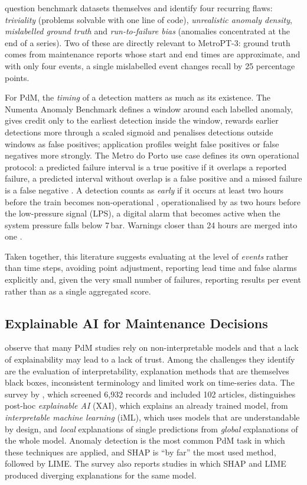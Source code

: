 \citet{wu2021flawed} question benchmark datasets themselves and identify four recurring flaws: \emph{triviality} (problems solvable with one line of code), \emph{unrealistic anomaly density}, \emph{mislabelled ground truth} and \emph{run-to-failure bias} (anomalies concentrated at the end of a series). Two of these are directly relevant to MetroPT-3: ground truth comes from maintenance reports whose start and end times are approximate, and with only four events, a single mislabelled event changes recall by 25 percentage points.

For PdM, the \emph{timing} of a detection matters as much as its existence. The Numenta Anomaly Benchmark \citep{lavin2015nab} defines a window around each labelled anomaly, gives credit only to the earliest detection inside the window, rewards earlier detections more through a scaled sigmoid and penalises detections outside windows as false positives; application profiles weight false positives or false negatives more strongly. The Metro do Porto use case defines its own operational protocol: a predicted failure interval is a true positive if it overlaps a reported failure, a predicted interval without overlap is a false positive and a missed failure is a false negative \citep{veloso2022metropt}. A detection counts as \emph{early} if it occurs at least two hours before the train becomes non-operational \citep{veloso2022metropt}, operationalised by \citet{silva2023adversarial} as two hours before the low-pressure signal (LPS), a digital alarm that becomes active when the system pressure falls below 7\,bar. Warnings closer than 24 hours are merged into one \citep{silva2023adversarial}.

Taken together, this literature suggests evaluating at the level of \emph{events} rather than time steps, avoiding point adjustment, reporting lead time and false alarms explicitly and, given the very small number of failures, reporting results per event rather than as a single aggregated score.

\subsection{Explainable AI for Maintenance Decisions}
\label{sec:xai}

\citet{vollert2021interpretable} observe that many PdM studies rely on non-interpretable models and that a lack of explainability may lead to a lack of trust. Among the challenges they identify are the evaluation of interpretability, explanation methods that are themselves black boxes, inconsistent terminology and limited work on time-series data. The survey by \citet{cummins2024xpdm}, which screened 6{,}932 records and included 102 articles, distinguishes post-hoc \emph{explainable AI} (XAI), which explains an already trained model, from \emph{interpretable machine learning} (iML), which uses models that are understandable by design, and \emph{local} explanations of single predictions from \emph{global} explanations of the whole model. Anomaly detection is the most common PdM task in which these techniques are applied, and SHAP is ``by far'' the most used method, followed by LIME. The survey also reports studies in which SHAP and LIME produced diverging explanations for the same model.

